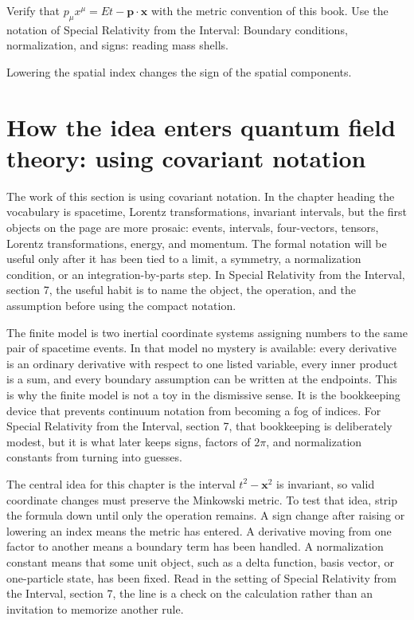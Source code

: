 \begin{exercise}
Verify that \(p_\mu x^\mu=Et-\bm p\cdot\bm x\) with the metric convention of this book.  Use the notation of Special Relativity from the Interval: Boundary conditions, normalization, and signs: reading mass shells.
\begin{answer}
Lowering the spatial index changes the sign of the spatial components.
\end{answer}
\end{exercise}



\section{How the idea enters quantum field theory: using covariant notation}

The work of this section is using covariant notation.  In the chapter heading the vocabulary is spacetime, Lorentz transformations, invariant intervals, but the first objects on the page are more prosaic: events, intervals, four-vectors, tensors, Lorentz transformations, energy, and momentum.  The formal notation will be useful only after it has been tied to a limit, a symmetry, a normalization condition, or an integration-by-parts step.  In Special Relativity from the Interval, section 7, the useful habit is to name the object, the operation, and the assumption before using the compact notation.

The finite model is two inertial coordinate systems assigning numbers to the same pair of spacetime events.  In that model no mystery is available: every derivative is an ordinary derivative with respect to one listed variable, every inner product is a sum, and every boundary assumption can be written at the endpoints.  This is why the finite model is not a toy in the dismissive sense.  It is the bookkeeping device that prevents continuum notation from becoming a fog of indices.  For Special Relativity from the Interval, section 7, that bookkeeping is deliberately modest, but it is what later keeps signs, factors of \(2\pi\), and normalization constants from turning into guesses.

The central idea for this chapter is the interval \(t^2-\bm x^2\) is invariant, so valid coordinate changes must preserve the Minkowski metric.  To test that idea, strip the formula down until only the operation remains.  A sign change after raising or lowering an index means the metric has entered.  A derivative moving from one factor to another means a boundary term has been handled.  A normalization constant means that some unit object, such as a delta function, basis vector, or one-particle state, has been fixed.  Read in the setting of Special Relativity from the Interval, section 7, the line is a check on the calculation rather than an invitation to memorize another rule.

